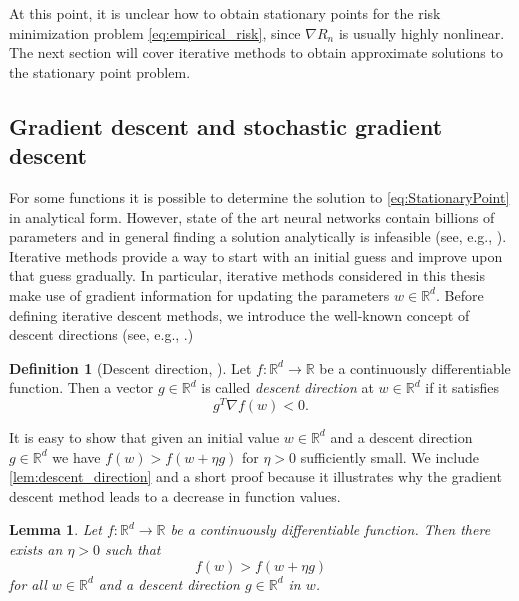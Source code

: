 \documentclass[12pt]{article}
\newtheorem{lemma}[lemma]{Lemma}
\theoremstyle{definition}
\newtheorem{definition}[definition]{Definition}
\numberwithin{equation}{section}
\newcommand{\R}{\mathbb{R}}
\begin{document}
At this point, it is unclear how to obtain stationary points for the risk minimization problem \eqref{eq:empirical_risk}, since $\nabla R_n$ is usually highly nonlinear. The next section will cover iterative methods to obtain approximate solutions to the stationary point problem.

\subsection{Gradient descent and stochastic gradient descent}
\label{subsec:gd_sgd}
For some functions it is possible to determine the solution to \eqref{eq:StationaryPoint} in analytical form. However, state of the art neural networks contain billions of parameters and in general finding a solution analytically is infeasible (see, e.g., \cite{brownLanguageModelsAre2020}). Iterative methods provide a way to start with an initial guess and improve upon that guess gradually. In particular, iterative methods considered in this thesis make use of gradient information for updating the parameters $w \in \R^d$. Before defining iterative descent methods, we introduce the well-known concept of descent directions (see, e.g., \cite{nocedalNumericalOptimization2006}.) 
\begin{definition}[Descent direction, ]
  Let $f: \R^d \rightarrow \R$ be a continuously differentiable function. Then a vector $g \in \R^d$ is called \emph{descent direction} at $w \in \R^d$ if it satisfies 
  \begin{equation}
    \label{eq:descent_direction}
    g^T \nabla f(w) < 0.
  \end{equation} 
\end{definition}
It is easy to show that given an initial value $w \in \R^d$ and a descent direction $g \in \R^d$ we have $f(w) > f(w + \eta g)$ for $\eta > 0$ sufficiently small. We include \autoref{lem:descent_direction} and a short proof because it illustrates why the gradient descent method leads to a decrease in function values.
\begin{lemma}
  \label{lem:descent_direction}
  Let $f : \R^d \rightarrow \R$ be a continuously differentiable function. Then there exists an $\eta > 0$ such that
  \begin{equation}
    f(w) > f(w + \eta g)
  \end{equation}
  for all $w \in \R^d$ and a descent direction $g \in \R^d$ in $w$.
\end{lemma}
\end{document}
